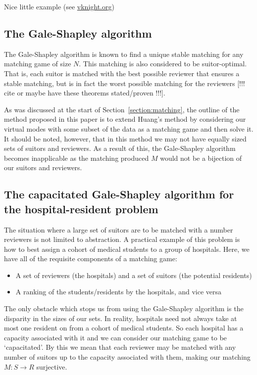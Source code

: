 \begin{example}\label{example:matching}
    Nice little example (see \url{vknight.org})
\end{example}

\subsection{The Gale-Shapley algorithm}\label{subsection:galeshapley}

The Gale-Shapley algorithm is known to find a unique stable matching for any 
matching game of size \(N\). This matching is also considered to be 
suitor-optimal. That is, each suitor is matched with the best possible reviewer
that ensures a stable matching, but is in fact the worst possible matching for 
the reviewers [!!! cite or maybe have these theorems stated/proven !!!]. 

As was discussed at the start of Section~\ref{section:matching}, the outline of
the method proposed in this paper is to extend Huang's method by considering our
virtual modes with some subset of the data as a matching game and then solve it.
It should be noted, however, that in this method we may not have equally sized 
sets of suitors and reviewers. As a result of this, the Gale-Shapley algorithm 
becomes inapplicable as the matching produced \(M\) would not be a bijection of 
our suitors and reviewers.

\subsection{The capacitated Gale-Shapley algorithm for the hospital-resident 
		problem}\label{subsection:capacitated-galeshapley}

The situation where a large set of suitors are to be matched with a number
reviewers is not limited to abstraction. A practical example of this problem is
how to best assign a cohort of medical students to a group of hospitals. Here, 
we have all of the requisite components of a matching game:

\begin{itemize}
	\item A set of reviewers (the hospitals) and a set of suitors (the potential
        residents) 
	\item A ranking of the students/residents by the hospitals, and vice versa
\end{itemize}

The only obstacle which stops us from using the Gale-Shapley algorithm is the 
disparity in the sizes of our sets. In reality, hospitals need not always take 
at most one resident on from a cohort of medical students. So each hospital has
a capacity associated with it and we can consider our matching game to be
`capacitated'. By this we mean that each reviewer may be matched with any number
of suitors up to the capacity associated with them, making our matching \(M: S 
\to R\) surjective. \\

